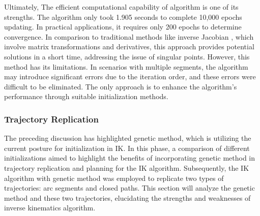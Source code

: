 Ultimately, The efficient computational capability of algorithm is one of its strengths. The algorithm only 
took 1.905 seconds to complete 10,000 epochs updating. In practical applications, it requires only 200 epochs 
to determine convergence. In comparison to traditional methods like inverse Jacobian \cite{inverse_jacobian}, 
which involve matrix transformations and derivatives, this approach provides potential solutions in a short 
time, addressing the issue of singular points. However, this method has its limitations. In scenarios with 
multiple segments, the algorithm may introduce significant errors due to the iteration order, and these errors 
were difficult to be eliminated. The only approach is to enhance the algorithm's performance through 
suitable initialization methods.
\subsubsection{Trajectory Replication}
The preceding discussion has highlighted genetic method, which is utilizing the current posture for 
initialization in IK. In this phase, a comparison of different initializations aimed to 
highlight the benefits of incorporating genetic method in trajectory replication and planning for the IK 
algorithm. Subsequently, the IK algorithm with genetic method was employed to 
replicate two types of trajectories: arc segments and closed paths. This section will analyze the genetic 
method and these two trajectories, elucidating the strengths and weaknesses of inverse kinematics algorithm. 

